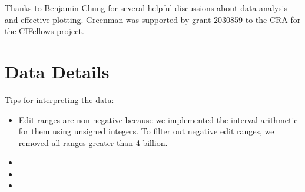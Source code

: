 \documentclass[english,submission,cleveref]{programming}
\begin{document}
\acks

Thanks to Benjamin Chung for several helpful discussions about data analysis
and effective plotting.
Greenman was supported by
grant \href{https://nsf.gov/awardsearch/showAward?AWD_ID=2030859&HistoricalAwards=false}{2030859}
to the CRA for the \href{https://cifellows2020.org}{CIFellows} project.

\newpage

\appendix

\section{Data Details}

Tips for interpreting the data:

\begin{itemize}
  \item
    Edit ranges are non-negative because we
    implemented the interval arithmetic for them using unsigned integers.
    To filter out negative edit ranges, we removed all ranges
    greater than 4 billion.

  \item
  \item
  \item
\end{itemize}

\newpage


\end{document}
